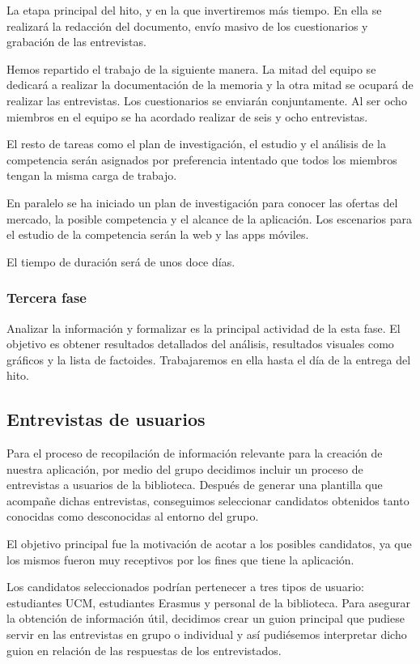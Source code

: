 \documentclass[12pt]{article}
\begin{document}
La etapa principal del hito, y en la que invertiremos más tiempo. En ella se realizará la redacción del documento, envío masivo de los cuestionarios y grabación de las entrevistas.

Hemos repartido el trabajo de la siguiente manera. La mitad del equipo se dedicará a realizar la documentación de la memoria y la otra mitad se ocupará de realizar las entrevistas. Los cuestionarios se enviarán conjuntamente. Al ser ocho miembros en el equipo se ha acordado realizar de seis y ocho entrevistas.

El resto de tareas como el plan de investigación, el estudio y el análisis de la competencia serán asignados por preferencia intentado que todos los miembros tengan la misma carga de trabajo.

En paralelo se ha iniciado un plan de investigación para conocer las ofertas del mercado, la posible competencia y el alcance de la aplicación. Los escenarios para el estudio de la competencia serán la web y las apps móviles.

El tiempo de duración será de unos doce días.

\subsubsection*{Tercera fase}

Analizar la información y formalizar es la principal actividad de la esta fase. El objetivo es obtener resultados detallados del análisis, resultados visuales como gráficos y la lista de factoides. Trabajaremos en ella hasta el día de la entrega del hito.

\subsection{Entrevistas de usuarios}

Para el proceso de recopilación de información relevante para la creación de nuestra aplicación, por medio del grupo decidimos incluir un proceso de entrevistas a usuarios de la biblioteca. Después de generar una plantilla que acompañe dichas entrevistas, conseguimos seleccionar candidatos obtenidos tanto conocidas como desconocidas al entorno del grupo.

El objetivo principal fue la motivación de acotar a los posibles candidatos, ya que los mismos fueron muy receptivos por los fines que tiene la aplicación. 

Los candidatos seleccionados podrían pertenecer a tres tipos de usuario: estudiantes UCM, estudiantes Erasmus y personal de la biblioteca. Para asegurar la obtención de información útil, decidimos crear un guion principal que pudiese servir en las entrevistas en grupo o individual y así pudiésemos interpretar dicho guion en relación de las respuestas de los entrevistados.
\end{document}
